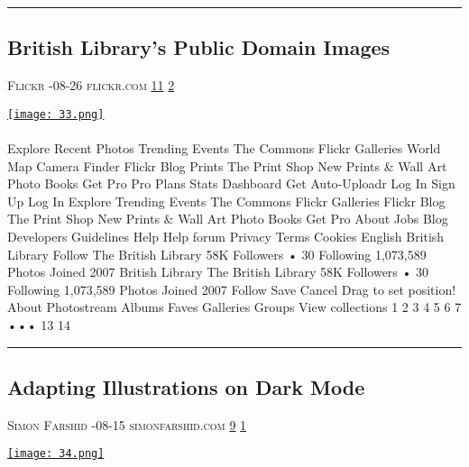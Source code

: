 \documentclass[10pt,a4paper]{article}
\begin{document}
\begin{multicols*}{2}
\par\noindent\textcolor{red}{\rule{\linewidth}{0.2mm}}
\vfill
\null
\noindent\begin{minipage}{\linewidth}
\subsection{British Library's Public Domain Images}
\textsc{\footnotesize
{\scriptsize\faUser}\space 
Flickr 
{\scriptsize\faCalendar}-08-26 
{\scriptsize\faGlobe}\space 
flickr.com 
{\scriptsize\faThumbsOUp}\space 
\href{http://news.ycombinator.com/item?id=37165281\&utm\_term=comment}{11} 
{\scriptsize\faComments}\space 
\href{http://news.ycombinator.com/item?id=37165281\&utm\_term=comment}{2} 
}
\par\medskip\noindent
\href{https://www.flickr.com/photos/britishlibrary/albums/?utm\_source=hackernewsletter\&utm\_medium=email\&utm\_term=design}{
    \texttt{[image: 33.png]}
}
\end{minipage}
\paragraph{}
Explore
Recent Photos
Trending
Events
The Commons
Flickr Galleries
World Map
Camera Finder
Flickr Blog
Prints
The Print Shop
New
Prints \& Wall Art
Photo Books
Get Pro
Pro Plans
Stats Dashboard
Get Auto-Uploadr
Log In
Sign Up
Log In
Explore
Trending
Events
The Commons
Flickr Galleries
Flickr Blog
The Print Shop
New
Prints \& Wall Art
Photo Books
Get Pro
About
Jobs
Blog
Developers
Guidelines
Help
Help forum
Privacy
Terms
Cookies
English
British Library
Follow
The British Library
58K Followers
•
30 Following
1,073,589 Photos
Joined 2007
British Library
The British Library
58K Followers
•
30 Following
1,073,589 Photos
Joined 2007
Follow
Save
Cancel
Drag to set position!
About
Photostream
Albums
Faves
Galleries
Groups
View collections
1
2
3
4
5
6
7
•••
13
14
\par\noindent\textcolor{red}{\rule{\linewidth}{0.2mm}}
\vfill
\null
\noindent\begin{minipage}{\linewidth}
\subsection{Adapting Illustrations on Dark Mode}
\textsc{\footnotesize
{\scriptsize\faUser}\space 
Simon Farshid 
{\scriptsize\faCalendar}-08-15 
{\scriptsize\faGlobe}\space 
simonfarshid.com 
{\scriptsize\faThumbsOUp}\space 
\href{http://news.ycombinator.com/item?id=37133657\&utm\_term=comment}{9} 
{\scriptsize\faComments}\space 
\href{http://news.ycombinator.com/item?id=37133657\&utm\_term=comment}{1} 
}
\par\medskip\noindent
\href{https://blog.simonfarshid.com/adapting-illustrations-to-dark-mode?utm\_source=hackernewsletter\&utm\_medium=email\&utm\_term=design}{
    \texttt{[image: 34.png]}
}
\end{minipage}

\end{multicols*}
\end{document}
